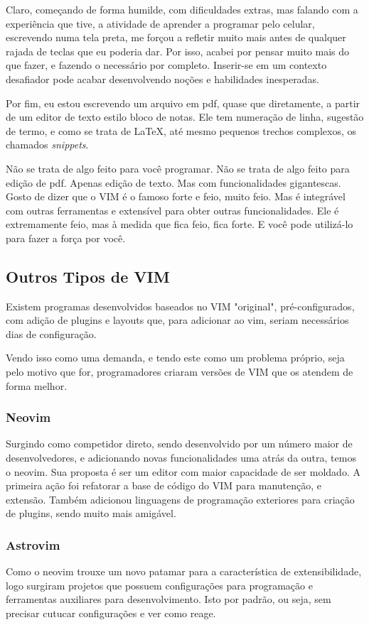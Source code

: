 \documentclass[a4paper, 12pt]{article}
\begin{document}
Claro, começando de forma humilde, com dificuldades extras, mas falando com a experiência que tive, a atividade de aprender a programar pelo celular, escrevendo numa tela preta, me forçou a refletir muito mais antes de qualquer rajada de teclas que eu poderia dar.
Por isso, acabei por pensar muito mais do que fazer, e fazendo o necessário por completo.
Inserir-se em um contexto desafiador pode acabar desenvolvendo noções e habilidades inesperadas.

Por fim, eu estou escrevendo um arquivo em pdf, quase que diretamente, a partir de um editor de texto estilo bloco de notas. 
Ele tem numeração de linha, sugestão de termo, e como se trata de \LaTeX, até mesmo pequenos trechos complexos, os chamados \textit{snippets}.

Não se trata de algo feito para você programar.
Não se trata de algo feito para edição de pdf.
Apenas edição de texto. Mas com funcionalidades gigantescas.
Gosto de dizer que o VIM é o famoso forte e feio, muito feio. 
Mas é integrável com outras ferramentas e extensível para obter outras funcionalidades.
Ele é extremamente feio, mas à medida que fica feio, fica forte.
E você pode utilizá-lo para fazer a força por você.

\subsection{Outros Tipos de VIM}
Existem programas desenvolvidos baseados no VIM "original", pré-configurados, com adição de plugins e layouts que, para adicionar ao vim, seriam necessários dias de configuração.

Vendo isso como uma demanda, e tendo este como um problema próprio, seja pelo motivo que for, programadores criaram versões de VIM que os atendem de forma melhor.
\subsubsection{Neovim}
Surgindo como competidor direto, sendo desenvolvido por um número maior de desenvolvedores, e adicionando novas funcionalidades uma atrás da outra, temos o neovim.
Sua proposta é ser um editor com maior capacidade de ser moldado.
A primeira ação foi refatorar a base de código do VIM para manutenção, e extensão.
Também adicionou linguagens de programação exteriores para criação de plugins, sendo muito mais amigável.
\subsubsection{Astrovim}
Como o neovim trouxe um novo patamar para a característica de extensibilidade, logo surgiram projetos que possuem configurações para programação e ferramentas auxiliares para desenvolvimento.
Isto por padrão, ou seja, sem precisar cutucar configurações e ver como reage.
\end{document}
